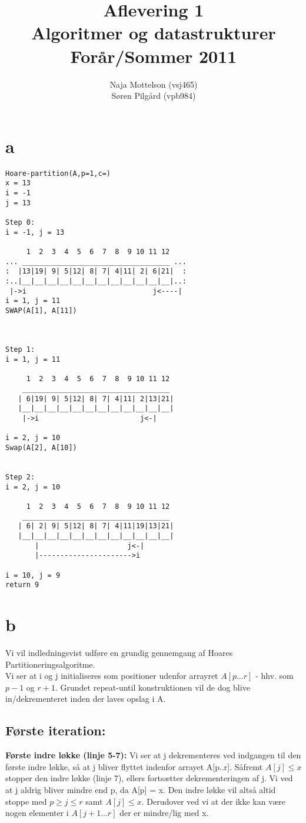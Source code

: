 \documentclass[10pt,a4paper,danish]{article}
\title{Aflevering 1 \\Algoritmer og datastrukturer\\Forår/Sommer 2011}
\author{Naja Mottelson (vsj465)\\Søren Pilgård (vpb984)}
\begin{document}
\maketitle
\newpage

\tableofcontents
\newpage

\section{a}
\begin{verbatim}
Hoare-partition(A,p=1,c=)
x = 13
i = -1
j = 13

Step 0:
i = -1, j = 13

     1  2  3  4  5  6  7  8  9 10 11 12
... ___________________________________ ...
:  |13|19| 9| 5|12| 8| 7| 4|11| 2| 6|21|  :
:..|__|__|__|__|__|__|__|__|__|__|__|__|..:
 |->i                              j<----|
i = 1, j = 11
SWAP(A[1], A[11])



Step 1:
i = 1, j = 11

     1  2  3  4  5  6  7  8  9 10 11 12
    ___________________________________ 
   | 6|19| 9| 5|12| 8| 7| 4|11| 2|13|21|
   |__|__|__|__|__|__|__|__|__|__|__|__|
    |->i                        j<-|

i = 2, j = 10
Swap(A[2], A[10])


Step 2:
i = 2, j = 10

     1  2  3  4  5  6  7  8  9 10 11 12
    ___________________________________ 
   | 6| 2| 9| 5|12| 8| 7| 4|11|19|13|21|
   |__|__|__|__|__|__|__|__|__|__|__|__|
       |                     j<-|
       |---------------------->i

i = 10, j = 9
return 9

\end{verbatim}
\section{b}
Vi vil indledningsvist udføre en grundig gennemgang af Hoares Partitioneringsalgoritme.
\\

Vi ser at i og j initialiseres som positioner udenfor arrayret $A[p \ldots r]$ - hhv. som $p-1$ og $r+1.$
Grundet repeat-until konstruktionen vil de dog blive in/dekrementeret inden der laves opslag i A.

\subsection{Første iteration:}
\label{sec:foerste-it}
\textbf{Første indre løkke (linje 5-7):}
Vi ser at j dekrementeres ved indgangen til den første indre løkke, så at j bliver flyttet indenfor arrayet A[p..r]. 
Såfremt $A[j] \leq x$ stopper den indre løkke (linje 7), ellers fortsætter dekrementeringen af j.
Vi ved at j aldrig bliver mindre end p, da A[p] = x. Den indre løkke vil altså altid stoppe med $p \geq j \leq r$ samt $A[j] \leq x$.
Derudover ved vi at der ikke kan være nogen elementer i $A[j+1 \ldots r]$ der er mindre/lig med x.
\\
 
\end{document}
